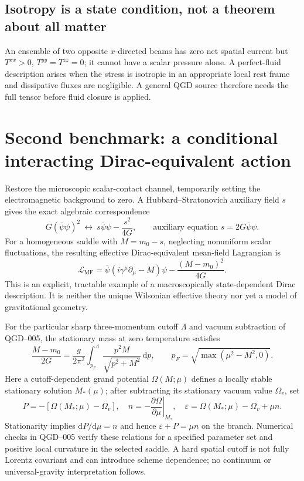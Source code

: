 \documentclass[11pt,a4paper]{article}
\newcommand{\dd}{\mathrm d}
\newcommand{\Lagr}{\mathcal L}
\begin{document}
\subsection{Isotropy is a state condition, not a theorem about all matter}
An ensemble of two opposite $x$-directed beams has zero net spatial current but $T^{xx}>0$, $T^{yy}=T^{zz}=0$; it cannot have a scalar pressure alone. A perfect-fluid description arises when the stress is isotropic in an appropriate local rest frame and dissipative fluxes are negligible. A general QGD source therefore needs the full tensor before fluid closure is applied.

\section{Second benchmark: a conditional interacting Dirac-equivalent action}\label{sec:meanfield}
Restore the microscopic scalar-contact channel, temporarily setting the electromagnetic background to zero. A Hubbard--Stratonovich auxiliary field $s$ gives the exact algebraic correspondence
\begin{equation}\label{eq:HS}
G(\bar\psi\psi)^2\ \longleftrightarrow\ s\bar\psi\psi-\frac{s^2}{4G},
\qquad\text{auxiliary equation }s=2G\bar\psi\psi.
\end{equation}
For a homogeneous saddle with $M=m_0-s$, neglecting nonuniform scalar fluctuations, the resulting effective Dirac-equivalent mean-field Lagrangian is
\begin{equation}\label{eq:meanfield}
\boxed{\Lagr_{\mathrm{MF}}=\bar\psi(i\gamma^\mu\partial_\mu-M)\psi-\frac{(M-m_0)^2}{4G}.}
\end{equation}
This is an explicit, tractable example of a macroscopically state-dependent Dirac description. It is neither the unique Wilsonian effective theory nor yet a model of gravitational geometry.

For the particular sharp three-momentum cutoff $\Lambda$ and vacuum subtraction of QGD--005, the stationary mass at zero temperature satisfies
\begin{equation}\label{eq:gap}
\frac{M-m_0}{2G}=\frac{g}{2\pi^2}\int_{p_F}^{\Lambda}\frac{p^2M}{\sqrt{p^2+M^2}}\,\dd p,
\qquad p_F=\sqrt{\max(\mu^2-M^2,0)}.
\end{equation}
Here a cutoff-dependent grand potential $\Omega(M;\mu)$ defines a locally stable stationary solution $M_*(\mu)$; after subtracting its stationary vacuum value $\Omega_v$, set
\begin{equation}\label{eq:interacting-eos}
P=-[\Omega(M_*;\mu)-\Omega_v],\quad
n=-\left.\frac{\partial\Omega}{\partial\mu}\right|_{M_*},\quad
\varepsilon=\Omega(M_*;\mu)-\Omega_v+\mu n.
\end{equation}
Stationarity implies $\dd P/\dd\mu=n$ and hence $\varepsilon+P=\mu n$ on the branch. Numerical checks in QGD--005 verify these relations for a specified parameter set and positive local curvature in the selected saddle. A hard spatial cutoff is not fully Lorentz covariant and can introduce scheme dependence; no continuum or universal-gravity interpretation follows.
\end{document}
